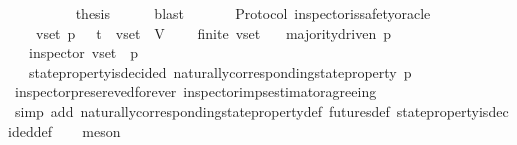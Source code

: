 \begin{isabellebody}
\ \ \ \isamarkupfalse%
\isanewline
\ \isamarkupfalse%
\isanewline
\ \isamarkupfalse%
\ \isamarkupfalse%
\ {\isacharquery}thesis\isanewline
\ \ \ \ \isamarkupfalse%
\ blast\isanewline
{}\isamarkupfalse%
%
\endisatagproof
{\isafoldproof}%
%
\isadelimproof
\ \ \ \ \isanewline
%
\endisadelimproof
\isanewline
\isanewline
{}\isamarkupfalse%
\ {\isacharparenleft}\ Protocol{\isacharparenright}\ inspector{\isacharunderscore}is{\isacharunderscore}safety{\isacharunderscore}oracle\ {\isacharcolon}\isanewline
\ \ {\isachardoublequoteopen}{\isasymforall}\ {\isasymsigma}\ v{\isacharunderscore}set\ p{\isachardot}\ {\isasymsigma}\ {\isasymin}\ {\isasymSigma}t\ {\isasymand}\ v{\isacharunderscore}set\ {\isasymsubseteq}\ V\ \isanewline
\ \ {\isasymlongrightarrow}\ finite\ v{\isacharunderscore}set\isanewline
\ \ {\isasymlongrightarrow}\ majority{\isacharunderscore}driven\ p\isanewline
\ \ {\isasymlongrightarrow}\ inspector\ {\isacharparenleft}v{\isacharunderscore}set{\isacharcomma}\ {\isasymsigma}{\isacharcomma}\ p{\isacharparenright}\isanewline
\ \ {\isasymlongrightarrow}\ state{\isacharunderscore}property{\isacharunderscore}is{\isacharunderscore}decided\ {\isacharparenleft}naturally{\isacharunderscore}corresponding{\isacharunderscore}state{\isacharunderscore}property\ p{\isacharcomma}\ {\isasymsigma}{\isacharparenright}{\isachardoublequoteclose}\ \ \ \ \isanewline
%
\isadelimproof
\ \ %
\endisadelimproof
%
\isatagproof
{}\isamarkupfalse%
\ inspector{\isacharunderscore}presereved{\isacharunderscore}forever\ inspector{\isacharunderscore}imps{\isacharunderscore}estimator{\isacharunderscore}agreeing\isanewline
\ \ \isamarkupfalse%
\ {\isacharparenleft}simp\ add{\isacharcolon}\ naturally{\isacharunderscore}corresponding{\isacharunderscore}state{\isacharunderscore}property{\isacharunderscore}def\ futures{\isacharunderscore}def\ state{\isacharunderscore}property{\isacharunderscore}is{\isacharunderscore}decided{\isacharunderscore}def{\isacharparenright}\isanewline
\ \ \isamarkupfalse%
\ meson%
\endisatagproof
{\isafoldproof}%
%
\isadelimproof
\isanewline
%
\endisadelimproof
%
\isadelimtheory
\isanewline
%
\endisadelimtheory
%
\isatagtheory
{}\isamarkupfalse%
%
\endisatagtheory
{\isafoldtheory}%
%
\isadelimtheory
%
\endisadelimtheory
%
\end{isabellebody}%
\endinput
